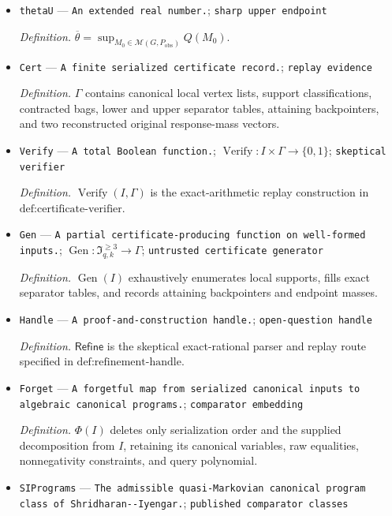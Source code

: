 \documentclass{article}
\begin{document}
\begin{itemize}
  \item \texttt{thetaU} --- \texttt{An extended real number.}; \texttt{sharp upper endpoint}
  \par\smallskip\noindent\emph{Definition.} \(\overline\theta=\sup_{M_0\in\mathcal M(G,P_{\mathrm{obs}})}Q(M_0)\).
  \item \texttt{Cert} --- \texttt{A finite serialized certificate record.}; \texttt{replay evidence}
  \par\smallskip\noindent\emph{Definition.} \(\Gamma\) contains canonical local vertex lists, support classifications, contracted bags, lower and upper separator tables, attaining backpointers, and two reconstructed original response-mass vectors.
  \item \texttt{Verify} --- \texttt{A total Boolean function.}; \(\operatorname{Verify}:I\times\Gamma\to\{0,1\}\); \texttt{skeptical verifier}
  \par\smallskip\noindent\emph{Definition.} \(\operatorname{Verify}(I,\Gamma)\) is the exact-arithmetic replay construction in \(\text{def:certificate-verifier}\).
  \item \texttt{Gen} --- \texttt{A partial certificate-\allowbreak{}producing function on well-\allowbreak{}formed inputs.}; \(\operatorname{Gen}:\mathfrak I_{q,k}^{\ge3}\to\Gamma\); \texttt{untrusted certificate generator}
  \par\smallskip\noindent\emph{Definition.} \(\operatorname{Gen}(I)\) exhaustively enumerates local supports, fills exact separator tables, and records attaining backpointers and endpoint masses.
  \item \texttt{Handle} --- \texttt{A proof-\allowbreak{}and-\allowbreak{}construction handle.}; \texttt{open-\allowbreak{}question handle}
  \par\smallskip\noindent\emph{Definition.} \(\mathsf{Refine}\) is the skeptical exact-rational parser and replay route specified in \(\text{def:refinement-handle}\).
  \item \texttt{Forget} --- \texttt{A forgetful map from serialized canonical inputs to algebraic canonical programs.}; \texttt{comparator embedding}
  \par\smallskip\noindent\emph{Definition.} \(\Phi(I)\) deletes only serialization order and the supplied decomposition from \(I\), retaining its canonical variables, raw equalities, nonnegativity constraints, and query polynomial.
  \item \texttt{SIPrograms} --- \texttt{The admissible quasi-\allowbreak{}Markovian canonical program class of Shridharan-\allowbreak{}-\allowbreak{}Iyengar.}; \texttt{published comparator classes}

\end{itemize}
\end{document}
